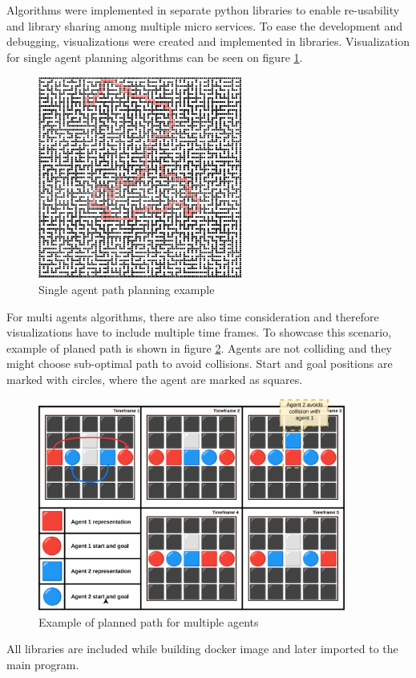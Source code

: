 Algorithms were implemented in separate python libraries to enable re-usability and library sharing among multiple micro services. To ease the development and debugging, visualizations were created and implemented in libraries. Visualization for single agent planning algorithms can be seen on figure \ref{fig:single_agent_path}.

\begin{figure}[H]
    \centering
    \includegraphics[width=0.6\textwidth]{pictures/single_path_maze.png}
    \caption{ Single agent path planning example} 
    \label{fig:single_agent_path}
\end{figure}


For multi agents algorithms, there are also time consideration and therefore visualizations have to include multiple time frames. To showcase this scenario, example of planed path is shown in figure \ref{fig:multiple_agent_path}. Agents are not colliding and they might choose sub-optimal path to avoid collisions. Start and goal positions are marked with circles, where the agent are marked as squares.

\begin{figure}[H]
    \centering
    \includegraphics[width=0.9\textwidth]{pictures/example_planning.png}
    \caption{ Example of planned path for multiple agents } 
    \label{fig:multiple_agent_path}
\end{figure}

All libraries are included while building docker image and later imported to the main program. 